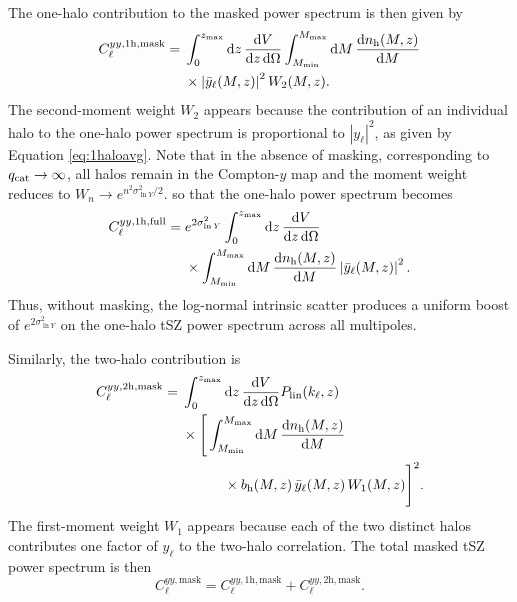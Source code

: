 \documentclass[aps,prd,twocolumn,superscriptaddress,nofootinbib,floatfix]{revtex4-2}
\begin{document}
The one-halo contribution to the masked power spectrum is then given by
\begin{equation}
\begin{aligned}
C_{\ell}^{yy,\mathrm{1h,mask}}
={}&
\int_{0}^{z_{\rm max}}
\mathrm{d}z\,
\frac{\mathrm{d}V}
{\mathrm{d}z\,\mathrm{d}\Omega}
\int_{M_{\rm min}}^{M_{\rm max}}
\mathrm{d}M\,
\frac{\mathrm{d}n_{\rm h}(M,z)}
{\mathrm{d}M}
\\
&\times
\left|\bar{y}_{\ell}(M,z)\right|^2
W_2(M,z).
\end{aligned}
\label{eq:masked_tsz_1h}
\end{equation}
The second-moment weight $W_2$ appears because the contribution of an individual halo to the one-halo power spectrum is proportional to
$|y_\ell|^2$, as given by Equation \ref{eq:1haloavg}. Note that in the absence of masking, corresponding to
$q_{\rm cat}\rightarrow\infty$, all halos remain in the Compton-$y$
map and the moment weight reduces to
$W_n\rightarrow e^{n^2\sigma_{\ln Y}^2/2}$.
so that the one-halo power spectrum becomes
\begin{equation}
\begin{aligned}
C_{\ell}^{yy,\mathrm{1h,full}}
={}&
e^{2\sigma_{\ln Y}^{2}}
\int_{0}^{z_{\rm max}}
\mathrm{d}z\,
\frac{\mathrm{d}V}
{\mathrm{d}z\,\mathrm{d}\Omega}
\\
&\times
\int_{M_{\rm min}}^{M_{\rm max}}
\mathrm{d}M\,
\frac{\mathrm{d}n_{\rm h}(M,z)}
{\mathrm{d}M}
\left|\bar y_{\ell}(M,z)\right|^{2}.
\end{aligned}
\label{eq:full_tsz_1h_scatter}
\end{equation}
Thus, without masking, the log-normal intrinsic scatter produces a
uniform boost of $e^{2\sigma_{\ln Y}^{2}}$ on the one-halo tSZ power spectrum across all multipoles. 

Similarly, the two-halo contribution is
\begin{equation}
\begin{aligned}
C_{\ell}^{yy,\mathrm{2h,mask}}
={}&
\int_{0}^{z_{\rm max}}
\mathrm{d}z\,
\frac{\mathrm{d}V}
{\mathrm{d}z\,\mathrm{d}\Omega}
P_{\rm lin}(k_\ell,z)
\\
&\times
\Bigg[
\int_{M_{\rm min}}^{M_{\rm max}}
\mathrm{d}M\,
\frac{\mathrm{d}n_{\rm h}(M,z)}
{\mathrm{d}M}
\\
&\qquad\quad\times
b_{\rm h}(M,z)\,
\bar{y}_{\ell}(M,z)\,
W_1(M,z)
\Bigg]^2 .
\end{aligned}
\label{eq:masked_tsz_2h}
\end{equation}
The first-moment weight $W_1$ appears because each of the two distinct
halos contributes one factor of $y_\ell$ to the two-halo correlation.
The total masked tSZ power spectrum is then
\begin{equation}
C_{\ell}^{yy,\mathrm{mask}}
=
C_{\ell}^{yy,\mathrm{1h,mask}}
+
C_{\ell}^{yy,\mathrm{2h,mask}}.
\label{eq:masked_tsz_total}
\end{equation}
\end{document}
